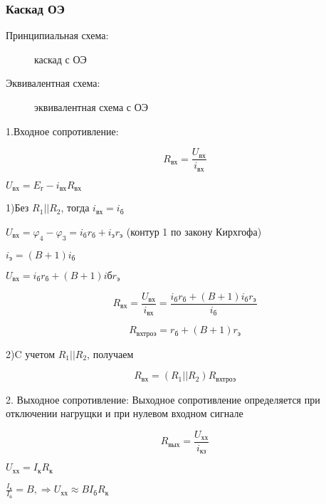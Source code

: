\subsubsection{Каскад ОЭ}

Принципиальная схема:
\begin{center}
	\begin{figure}[h!]
		\caption{каскад с ОЭ}
	\end{figure}
\end{center}

Эквивалентная схема:
\begin{center}
	\begin{figure}[h!]
		\caption{эквивалентная схема с ОЭ}
	\end{figure}
\end{center}

1.Входное сопротивление:

$$R_{\textit{вх}}=\frac{U_{\textit{вх}}}{i_{\textit{вх}}}$$

$U_{\textit{вх}}= E_{\textit{г}} - i_{\textit{вх}}R_{\textit{вх}}$

1)Без $R_1 || R_2$, тогда $i_\textit{вх}=i_\textit{б}$

$U_{\textit{вх}}=\varphi_4-\varphi_3=i_\textit{б}r_\textit{б}+i_\textit{э}r_\textit{э}$
(контур 1 по закону Кирхгофа)

$i_{\textit{э}}=(B+1)i_\textit{б}$

$U_{\textit{вх}}=i_\textit{б}r_\textit{б}+(B+1)i\textit{б}r_\textit{э}$

$$
R_{\textit{вх}} = \frac{U_{\textit{вх}}}{i_{\textit{вх}}} = \frac{i_{\textit{б}}r_{\textit{б}} + (B+1)i_{\textit{б}}r_{\textit{э}} }{i_{\textit{б}}}
$$

$$
R_\textit{вхтроэ}=r_\textit{б} + (B+1)r_\textit{э}
$$

2)C учетом $R_1 || R_2$, получаем

$$
R_\textit{вх}=(R_1||R_2)R_\textit{вхтроэ}
$$

2. Выходное сопротивление:
 Выходное сопротивление определяется при отключении нагрущки и при нулевом входном сигнале
 
 $$R_\textit{вых}=\frac{U_\textit{хх}}{i_\textit{кз}}$$

$ U_\textit{хх}=I_\textit{к}R_\textit{к} $

$\frac{I_\textit{к}}{I_\textit{б}}=B,\Rightarrow U_\textit{хх}\approx BI_\textit{б}R_\textit{к}$

